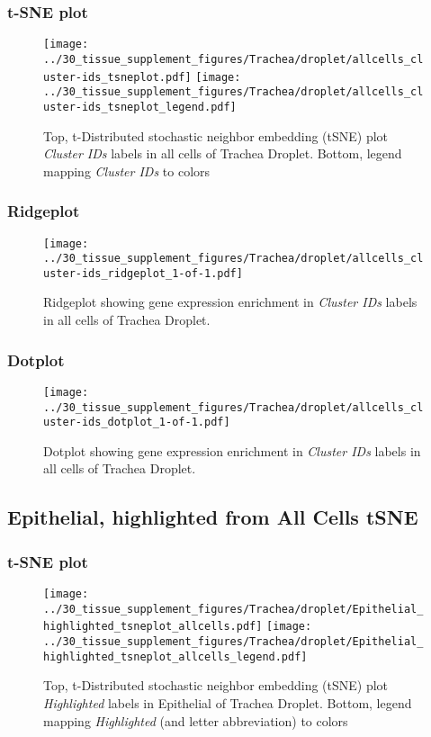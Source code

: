 \clearpage
\subsubsection{t-SNE plot}
\begin{figure}[h]
\centering
\texttt{[image: ../30\_tissue\_supplement\_figures/Trachea/droplet/allcells\_cluster-ids\_tsneplot.pdf]}
\texttt{[image: ../30\_tissue\_supplement\_figures/Trachea/droplet/allcells\_cluster-ids\_tsneplot\_legend.pdf]}
\caption{Top, t-Distributed stochastic neighbor embedding (tSNE) plot  \emph{Cluster IDs} labels in all cells of Trachea Droplet. Bottom, legend mapping \emph{Cluster IDs} to colors}
\end{figure}


\clearpage

\subsubsection{Ridgeplot}
\begin{figure}[h]
\centering
\texttt{[image: ../30\_tissue\_supplement\_figures/Trachea/droplet/allcells\_cluster-ids\_ridgeplot\_1-of-1.pdf]}

\caption{ Ridgeplot  showing gene expression enrichment in \emph{Cluster IDs} labels in all cells of Trachea Droplet. }
\end{figure}


\clearpage

\subsubsection{Dotplot}
\begin{figure}[h]
\centering
\texttt{[image: ../30\_tissue\_supplement\_figures/Trachea/droplet/allcells\_cluster-ids\_dotplot\_1-of-1.pdf]}

\caption{ Dotplot  showing gene expression enrichment in \emph{Cluster IDs} labels in all cells of Trachea Droplet. }
\end{figure}


\clearpage
\subsection{Epithelial, highlighted from All Cells tSNE}
\subsubsection{t-SNE plot}
\begin{figure}[h]
\centering
\texttt{[image: ../30\_tissue\_supplement\_figures/Trachea/droplet/Epithelial\_highlighted\_tsneplot\_allcells.pdf]}
\texttt{[image: ../30\_tissue\_supplement\_figures/Trachea/droplet/Epithelial\_highlighted\_tsneplot\_allcells\_legend.pdf]}
\caption{Top, t-Distributed stochastic neighbor embedding (tSNE) plot  \emph{Highlighted} labels in Epithelial of Trachea Droplet. Bottom, legend mapping \emph{Highlighted} (and letter abbreviation) to colors}
\end{figure}


